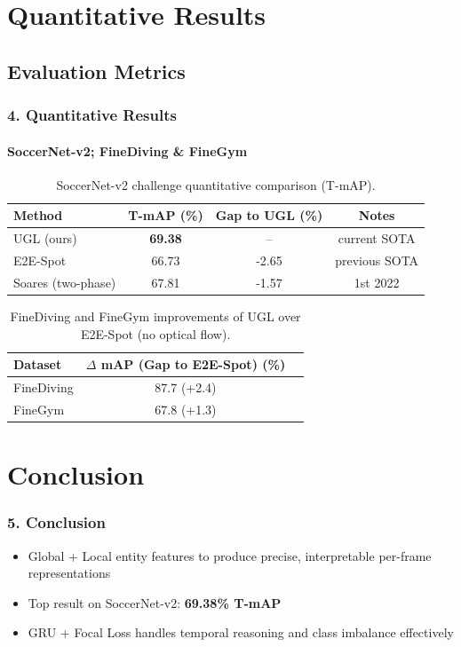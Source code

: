 \documentclass[aspectratio=169, lecture, amberg]{OTHAWbeamer}
\begin{document}
	\section{Quantitative Results}
\subsection{Evaluation Metrics}

\begin{frame}
\frametitle{4. Quantitative Results}
\framesubtitle{SoccerNet-v2; FineDiving \& FineGym}

\begin{table}[ht]
\centering
\caption{SoccerNet-v2 challenge quantitative comparison (T-mAP).}\label{tab:soccernet_results}
\begin{tabular}{lccc}
\toprule
Method & T-mAP (\%) & Gap to UGL (\%) & Notes \\
\midrule
UGL (ours) & \textbf{69.38} & -- & current SOTA \\
E2E-Spot & 66.73 & -2.65 & previous SOTA \\
Soares (two-phase) & 67.81 & -1.57 & 1st 2022\\
\bottomrule
\end{tabular}
\end{table}

\vspace{0.4cm}

\begin{table}[ht]
\centering
\caption{FineDiving and FineGym improvements of UGL over E2E-Spot (no optical flow).}\label{tab:finediving_finegym_results}
\begin{tabular}{lcc}
\toprule
Dataset & $\Delta$ mAP (Gap to E2E-Spot) (\%) \\
\midrule
FineDiving & 87.7 (+2.4) \\
FineGym & 67.8 (+1.3) \\
\bottomrule
\end{tabular}
\end{table}

\end{frame}

\section{Conclusion}

\begin{frame}
\frametitle{5. Conclusion}
\begin{itemize}
	\item Global + Local entity features to produce precise, interpretable per-frame representations
	\item Top result on SoccerNet‑v2: \textbf{69.38\% T‑mAP} 
	\item GRU + Focal Loss handles temporal reasoning and class imbalance effectively
\end{itemize}
\end{frame}
\end{document}
